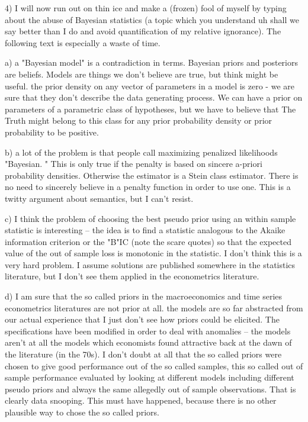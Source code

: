 \documentclass{article}
\begin{document}
4) I will now run out on thin ice and make a (frozen) fool of myself by typing about the abuse of Bayesian statistics (a topic which you understand uh shall we say better than I do and avoid quantification of my relative ignorance).  The following text is especially a waste of time.

a) a "Bayesian model" is a contradiction in terms.  Bayesian priors and posteriors are beliefs.  Models are things we don't believe are true, but think might be useful.  the prior density on any vector of parameters in a model is zero - we are sure that they don't describe the data generating process.  We can have a prior on parameters of a parametric class of hypotheses,  but we have to believe that The Truth might belong to this class for any prior probability density or prior probability to be positive.

b) a lot of the problem is that people call maximizing penalized likelihoods "Bayesian. " This is only true if the penalty is based on sincere a-priori probability densities.  Otherwise the estimator is a Stein class estimator.  There is no need to sincerely believe in a penalty function in order to use one. This is a twitty argument about semantics, but I can't resist.

c) I think the problem of choosing the best pseudo prior using an within sample statistic is interesting -- the idea is to find a statistic analogous to the Akaike information criterion or the "B"IC  (note the scare quotes) so that the expected value of the out of sample loss is monotonic in the statistic.  I don't think this is a very hard problem.  I assume solutions are published somewhere in the statistics literature, but I don't see them applied in the econometrics literature.

d) I am sure that the so called priors in the macroeconomics and time series econometrics literatures are not prior at all.  the models are so far abstracted from our actual experience that I just don't see how priors could be elicited.  The specifications have been modified in order to deal with anomalies -- the models aren't at all the models which economists found attractive back at the dawn of the literature (in the 70s).  I don't doubt at all that the so called priors were chosen to give good performance out of the so called samples, this so called out of sample performance evaluated by looking at different models including different pseudo priors and always the same allegedly out of sample observations. That is clearly data snooping.  This must have happened, because there is no other plausible way to chose the so called priors.  
\end{document}
